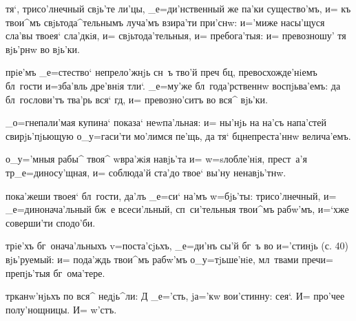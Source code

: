 тя`, трисо'лнечный свjь'те ли'цы, _е=ди'нственный же 
па'ки существо'мъ, и= къ твои^мъ свjьтода^тельнымъ 
луча'мъ взира'ти при'снw: и='миже насы'щуся сла'вы твоея` 
сла'дкiя, и= свjьтода'тельныя, и= пребога'тыя: и= 
превозношу' тя вjь'рнw во вjь'ки.

прiе'мъ _е=стество` непрело'жнjь сн~ъ тво'й преч 
бц, превосхожде'нiемъ бл~гости и=зба'вль дре'внiя 
тли`. _е=му'же бл~года'рственнw воспjьва'емъ: да 
бл~гослови'тъ тва'рь вся` гд, и= превозно'ситъ во вся^ 
вjь'ки.


_о=гнепали'мая купина` показа` неwпа'льная: и= ны'нjь на 
на'съ напа'стей свирjь'пjьющую о_у=гаси'ти мо'лимся 
пе'щь, да тя` бц непреста'ннw велича'емъ.

о_у='мныя рабы^ твоя^ w\т вра'жiя навjь'та и= 
w=sлобле'нiя, прест~а'я тр _е=диносу'щная, и= 
соблюда'й ста'до твое` вы'ну ненавjь'тнw. %

пока'жеши твоея` бл~гости, да'лъ _е=си` на'мъ w=бjь'ты: 
трисо'лнечный, и= _е=динонача'льный бж~е всеси'льный, 
сп~си'тельныя твои^мъ рабw'мъ, и=`хже соверши'ти 
сподо'би.

трiе'хъ бг~онача'льныхъ v=поста'сjьхъ, _е=ди'нъ сы'й бг~ъ 
во и='стинjь (с. 40) вjь'руемый: и= пода'ждь твои^мъ 
рабw'мъ о_у=тjьше'нiе, мл~твами преч и= препjь'тыя 
бг~ома'тере.

тр канw'нjьхъ по вся^ недjь^ли: Д%
_е='сть, jа='кw вои'стинну: %
сея`. И= про'чее полу'нощницы. И= w'стъ.%
